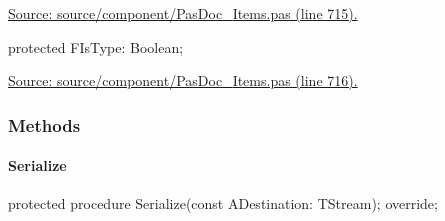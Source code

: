 \documentclass{report}
\newif\ifpdf
\begin{document}
\begin{list}{}
\begin{flushleft}
\ifpdf
\end{flushleft}
\fi


\par  \par
\href{https://github.com/pasdoc/pasdoc/blob/master/source/component/PasDoc_Items.pas#L715}{Source: source/component/PasDoc{\_}Items.pas (line 715).}\label{PasDoc_Items.TPasRoutine-FIsType}
\item[\textbf{FIsType}\hfill]
\ifpdf
\begin{flushleft}
\fi
\begin{ttfamily}
protected FIsType: Boolean;\end{ttfamily}

\ifpdf
\end{flushleft}
\fi


\par  \par
\href{https://github.com/pasdoc/pasdoc/blob/master/source/component/PasDoc_Items.pas#L716}{Source: source/component/PasDoc{\_}Items.pas (line 716).}\end{list}
\subsubsection*{\large{\textbf{Methods}}\normalsize\hspace{1ex}\hfill}
\paragraph*{Serialize}\hspace*{\fill}

\label{PasDoc_Items.TPasRoutine-Serialize}
\begin{list}{}{
\setlength{\itemindent}{0cm}
\setlength{\listparindent}{0cm}
\setlength{\leftmargin}{\evensidemargin}
\addtolength{\leftmargin}{\tmplength}
\settowidth{\labelsep}{X}
\addtolength{\leftmargin}{\labelsep}
\setlength{\labelwidth}{\tmplength}
}
\item[\textbf{Declaration}\hfill]
\ifpdf
\begin{flushleft}
\fi
\begin{ttfamily}
protected procedure Serialize(const ADestination: TStream); override;\end{ttfamily}

\ifpdf
\end{flushleft}
\fi

\end{list}
\end{document}
